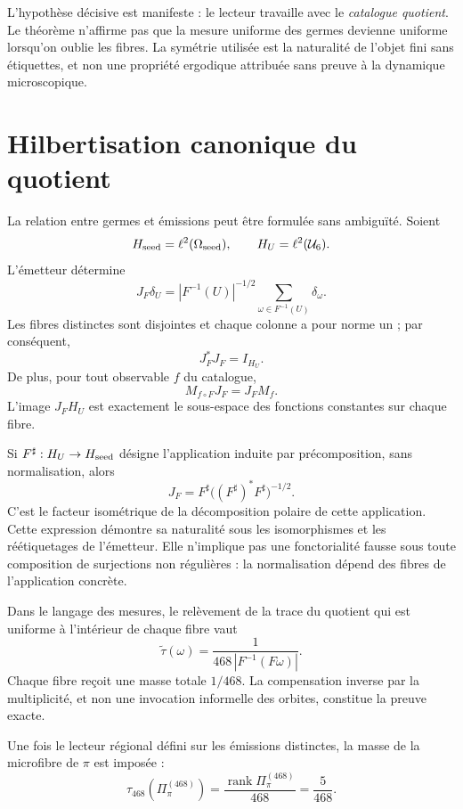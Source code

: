 L’hypothèse décisive est manifeste : le lecteur travaille avec le
\emph{catalogue quotient}. Le théorème n’affirme pas que la mesure uniforme des
germes devienne uniforme lorsqu’on oublie les fibres. La symétrie utilisée
est la naturalité de l’objet fini sans étiquettes, et non une propriété
ergodique attribuée sans preuve à la dynamique microscopique.

\section{Hilbertisation canonique du quotient}

La relation entre germes et émissions peut être formulée sans ambiguïté.
Soient
\[
 H_{\rm seed}=\ell^2(\Omega_{\rm seed}),
 \qquad
 H_U=\ell^2(\mathcal U_6).
\]
L’émetteur détermine
\[
 \boxed{
 J_F\delta_U
 =|F^{-1}(U)|^{-1/2}
 \sum_{\omega\in F^{-1}(U)}\delta_\omega.
 }
\]
Les fibres distinctes sont disjointes et chaque colonne a pour norme un ; par
conséquent,
\[
 J_F^*J_F=I_{H_U}.
\]
De plus, pour tout observable \(f\) du catalogue,
\[
 M_{f\circ F}J_F=J_FM_f.
\]
L’image \(J_FH_U\) est exactement le sous-espace des fonctions constantes
sur chaque fibre.

Si \(F^\sharp:H_U\to H_{\rm seed}\) désigne l’application induite par
précomposition, sans normalisation,
alors
\[
 J_F
 =F^\sharp\bigl((F^\sharp)^*F^\sharp\bigr)^{-1/2}.
\]
C’est le facteur isométrique de la décomposition polaire de cette application. Cette
expression démontre sa naturalité sous les isomorphismes et les réétiquetages de
l’émetteur. Elle n’implique pas une fonctorialité fausse sous toute composition de
surjections non régulières : la normalisation dépend des fibres de
l’application concrète.

Dans le langage des mesures, le relèvement de la trace du quotient qui est
uniforme à l’intérieur de chaque fibre vaut
\[
 \widetilde\tau(\omega)
 =\frac1{468\,|F^{-1}(F\omega)|}.
\]
Chaque fibre reçoit une masse totale \(1/468\). La compensation inverse par
la multiplicité, et non une invocation informelle des orbites, constitue la preuve exacte.

\begin{corollary}[Canonicité de \(5/468\)]
\label{p3-20260826:cor:canonicidad-cinco-468}
Une fois le lecteur régional défini sur les émissions distinctes, la masse
de la microfibre de \(\pi\) est imposée :
\[
 \tau_{468}(\Pi_\pi^{(468)})
 =\frac{\operatorname{rank}\Pi_\pi^{(468)}}{468}
 =\frac5{468}.
\]
\end{corollary}

